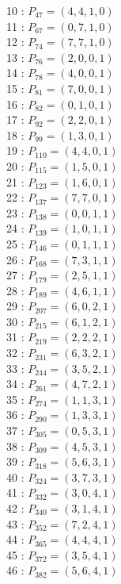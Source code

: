 \documentclass{article}
\begin{document}
{\begin{multicols}{2}
10 : $P_{47}=( 4, 4, 1, 0 )$\\
11 : $P_{67}=( 0, 7, 1, 0 )$\\
12 : $P_{74}=( 7, 7, 1, 0 )$\\
13 : $P_{76}=( 2, 0, 0, 1 )$\\
14 : $P_{78}=( 4, 0, 0, 1 )$\\
15 : $P_{81}=( 7, 0, 0, 1 )$\\
16 : $P_{82}=( 0, 1, 0, 1 )$\\
17 : $P_{92}=( 2, 2, 0, 1 )$\\
18 : $P_{99}=( 1, 3, 0, 1 )$\\
19 : $P_{110}=( 4, 4, 0, 1 )$\\
20 : $P_{115}=( 1, 5, 0, 1 )$\\
21 : $P_{123}=( 1, 6, 0, 1 )$\\
22 : $P_{137}=( 7, 7, 0, 1 )$\\
23 : $P_{138}=( 0, 0, 1, 1 )$\\
24 : $P_{139}=( 1, 0, 1, 1 )$\\
25 : $P_{146}=( 0, 1, 1, 1 )$\\
26 : $P_{168}=( 7, 3, 1, 1 )$\\
27 : $P_{179}=( 2, 5, 1, 1 )$\\
28 : $P_{189}=( 4, 6, 1, 1 )$\\
29 : $P_{207}=( 6, 0, 2, 1 )$\\
30 : $P_{215}=( 6, 1, 2, 1 )$\\
31 : $P_{219}=( 2, 2, 2, 1 )$\\
32 : $P_{231}=( 6, 3, 2, 1 )$\\
33 : $P_{244}=( 3, 5, 2, 1 )$\\
34 : $P_{261}=( 4, 7, 2, 1 )$\\
35 : $P_{274}=( 1, 1, 3, 1 )$\\
36 : $P_{290}=( 1, 3, 3, 1 )$\\
37 : $P_{305}=( 0, 5, 3, 1 )$\\
38 : $P_{309}=( 4, 5, 3, 1 )$\\
39 : $P_{318}=( 5, 6, 3, 1 )$\\
40 : $P_{324}=( 3, 7, 3, 1 )$\\
41 : $P_{332}=( 3, 0, 4, 1 )$\\
42 : $P_{340}=( 3, 1, 4, 1 )$\\
43 : $P_{352}=( 7, 2, 4, 1 )$\\
44 : $P_{365}=( 4, 4, 4, 1 )$\\
45 : $P_{372}=( 3, 5, 4, 1 )$\\
46 : $P_{382}=( 5, 6, 4, 1 )$\\

\end{multicols}}
\end{document}
